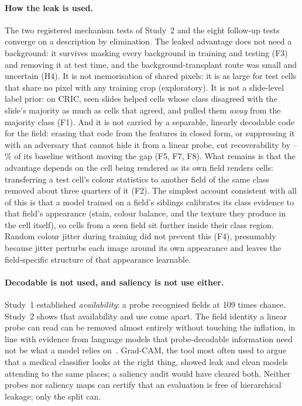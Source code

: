 \paragraph{How the leak is used.} The two registered mechanism tests of Study~2 and the eight
follow-up tests converge on a description by elimination. The leaked advantage does not need a
background: it survives masking every background in training and testing (F3) and removing it
at test time, and the background-transplant route was small and uncertain (H4). It is not
memorisation of shared pixels: it is as large for test cells that share no pixel with any
training crop (exploratory). It is not a slide-level label prior: on CRIC, seen slides helped
cells whose class disagreed with the slide's majority as much as cells that agreed, and pulled
them \emph{away} from the majority class (F1). And it is not carried by a separable,
linearly decodable code for the field: erasing that code from the features in closed form,
or suppressing it with an adversary that cannot hide it from a linear probe, cut
recoverability by \RecoveryCutMin--\RecoveryCutMax\% of its baseline without moving the gap (F5, F7, F8). What remains is that the
advantage depends on the cell being rendered as its own field renders cells: transferring a
test cell's colour statistics to another field of the same class removed about three quarters
of it (F2). The simplest account consistent with all of this is that a model trained on a
field's siblings calibrates its class evidence to that field's appearance (stain, colour
balance, and the texture they produce in the cell itself), so cells from a seen field sit
further inside their class region. Random colour jitter during training did not prevent this
(F4), presumably because jitter perturbs each image around its own appearance and leaves the
field-specific structure of that appearance learnable.

\paragraph{Decodable is not used, and saliency is not use either.} Study~1 established
\emph{availability}: a probe recognised fields at 109 times chance. Study~2 shows that
availability and use come apart. The field identity a linear probe can read can be removed
almost entirely without touching the inflation, in line with evidence from language models that
probe-decodable information need not be what a model relies on~\citep{elazar2021amnesic,ravichander2021probing}.
Grad-CAM, the tool most often used to argue that a medical classifier looks at the right
thing, showed leak and clean models attending to the same places; a saliency audit would have
cleared both. Neither probes nor saliency maps can certify that an evaluation is free of
hierarchical leakage; only the split can.

